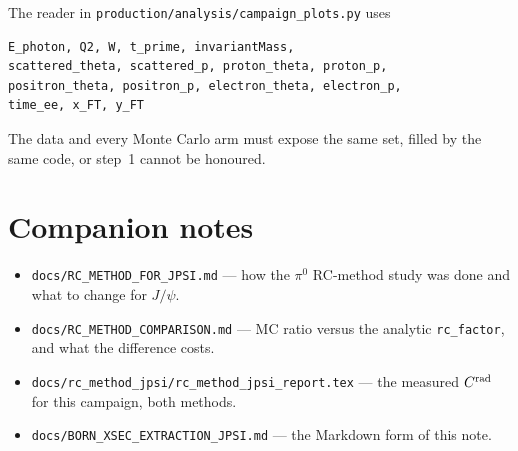 \documentclass[11pt]{article}
\newcommand{\crad}{C^{\rm rad}}
\begin{document}
The reader in \texttt{production/analysis/campaign\_plots.py} uses
\begin{verbatim}
E_photon, Q2, W, t_prime, invariantMass,
scattered_theta, scattered_p, proton_theta, proton_p,
positron_theta, positron_p, electron_theta, electron_p,
time_ee, x_FT, y_FT
\end{verbatim}
The data and every Monte Carlo arm must expose the same set, filled by the same code, or step~1
cannot be honoured.

\section*{Companion notes}

\begin{itemize}
\item \texttt{docs/RC\_METHOD\_FOR\_JPSI.md} --- how the $\pi^0$ RC-method study was done and what
to change for $J/\psi$.
\item \texttt{docs/RC\_METHOD\_COMPARISON.md} --- MC ratio versus the analytic \texttt{rc\_factor},
and what the difference costs.
\item \texttt{docs/rc\_method\_jpsi/rc\_method\_jpsi\_report.tex} --- the measured $\crad$ for this
campaign, both methods.
\item \texttt{docs/BORN\_XSEC\_EXTRACTION\_JPSI.md} --- the Markdown form of this note.
\end{itemize}
\end{document}
